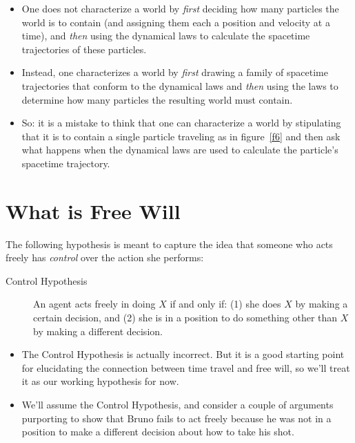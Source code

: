 \documentclass[12pt]{extarticle}
\begin{document}
\begin{itemize}

\item One does not characterize a world by \emph{first} deciding how many particles the world is to contain (and assigning them each a position and velocity at a time), and \emph{then} using the dynamical laws to calculate the spacetime trajectories of these particles. 

\item Instead, one characterizes a world by \emph{first} drawing a family of spacetime trajectories that conform to the dynamical laws and \emph{then} using the laws to determine how many particles the resulting world must contain. 

\item So: it is a mistake to think that one can characterize a world by stipulating that it is to contain a single particle traveling as in figure~\ref{f6} and then ask what happens when the dynamical laws are used to calculate the particle's spacetime trajectory.


\end{itemize}




\section{What is Free Will}

The following hypothesis is meant to capture the idea that someone who acts freely has \emph{control} over the action she performs:
\begin{description}
\item[Control Hypothesis]
An agent acts freely in doing $X$ if and only if: (1) she does $X$ by making a certain decision, and (2) she is in a position to do something other than $X$ by making a different decision.

\end{description}


\begin{itemize}
\item The Control Hypothesis is actually incorrect. But it is a good starting point for elucidating the connection between time travel and free will, so we'll treat it as our working hypothesis for now.

\item We'll assume the Control Hypothesis, and consider a couple of arguments purporting to show that Bruno fails to act freely because he was {not} in a position to make a different decision about how to take his shot.
\end{itemize}
\end{document}
